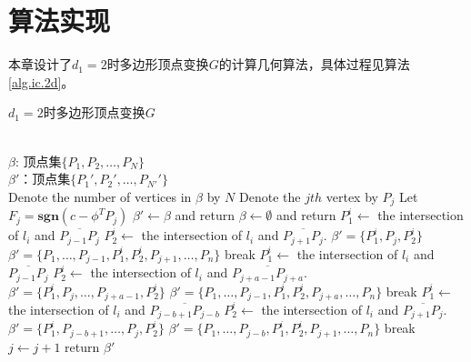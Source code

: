 \section{算法实现}\label{sect:3.3}
本章设计了$d_{1}=2$时多边形顶点变换$G$的计算几何算法，具体过程见算法\ref{alg.ic.2d}。

\begin{algo}%
\caption{$d_{1}=2$时多边形顶点变换$G$}
\label{alg.ic.2d}
\begin{algorithmic}
\REQUIRE\\
$\beta$: 顶点集$\{P_{1},P_{2},\ldots,P_{N}\}$\\
\ENSURE
$\beta'$：顶点集$\{P_{1}',P_{2}',\ldots,P_{N'}'\}$\\
\STATE Denote the number of vertices in $\beta$ by $N$
	\STATE Denote the $jth$ vertex by $P_{j}$
	\STATE Let $F_{j}=\mathbf{sgn}(c-\phi^{T}P_{j})$
\ENDFOR
{}
	\STATE $\beta'\leftarrow\beta$ and return
	\STATE $\beta\leftarrow\emptyset$ and return
\ENDIF
{}
		\STATE $P_{1}^{i}\leftarrow$ the intersection of $l_{i}$ and $\overline{P_{j-1}P_{j}}$
		\STATE $P_{2}^{i}\leftarrow$ the intersection of $l_{i}$ and $\overline{P_{j+1}P_{j}}$.
			\STATE$\beta'=\{P_{1}^{i},P_{j},P_{2}^{i}\}$
		\ELSE
			\STATE$\beta'=\{P_{1},\ldots,P_{j-1},P_{1}^{i},P_{2}^{i},P_{j+1},\ldots,P_{n}\}$
		\ENDIF
        \STATE break
		\STATE $P_{1}^{i}\leftarrow$ the intersection of $l_{i}$ and $\overline{P_{j-1}P_{j}}$
		\STATE $P_{2}^{i}\leftarrow$ the intersection of $l_{i}$ and $\overline{P_{j+a-1}P_{j+a}}$.
			\STATE$\beta'=\{P_{1}^{i},P_{j},\ldots,P_{j+a-1},P_{2}^{i}\}$
		\ELSE
			\STATE$\beta'=\{P_{1},\ldots,P_{j-1},P_{1}^{i},P_{2}^{i},P_{j+a},\ldots,P_{n}\}$
		\ENDIF
        \STATE break
		\STATE $P_{1}^{i}\leftarrow$ the intersection of $l_{i}$ and $\overline{P_{j-b+1}P_{j-b}}$
		\STATE $P_{2}^{i}\leftarrow$ the intersection of $l_{i}$ and $\overline{P_{j+1}P_{j}}$.
			\STATE$\beta'=\{P_{1}^{i},P_{j-b+1},\ldots,P_{j},P_{2}^{i}\}$
		\ELSE
			\STATE$\beta'=\{P_{1},\ldots,P_{j-b},P_{1}^{i},P_{2}^{i},P_{j+1},\ldots,P_{n}\}$
		\ENDIF
        \STATE break
    \ENDIF
	\STATE $j\leftarrow j+1$
\ENDFOR
\STATE return $\beta'$
\end{algorithmic}
\end{algo}
